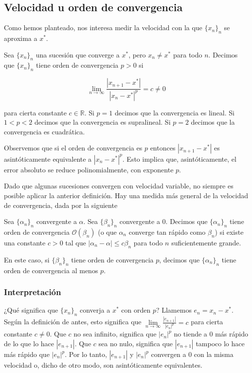 \subsection{Velocidad u orden de convergencia}

Como hemos planteado, nos interesa medir la velocidad con la que $\{x_n\}_n$ se aproxima a $x^*$.

\begin{defi}
Sea $\{x_n\}_n$ una sucesión que converge a $x^*$, pero $x_n \neq x^*$ para todo $n$. Decimos que $\{x_n\}_n$ tiene orden de convergencia $p > 0$ si

\[\lim\limits_{n \to \infty} \frac{|x_{n + 1} - x^*|}{|x_n - x^*|^p} = c \neq 0\]

para cierta constante $c \in \mathbb{R}$. Si $p = 1$ decimos que la convergencia es lineal.
Si $1 < p < 2$ decimos que la convergencia es supralineal.
Si $p = 2$ decimos que la convergencia es cuadrática.
\end{defi}

Observemos que si el orden de convergencia es $p$ entonces $|x_{n + 1} - x^*|$ es asintóticamente equivalente a $|x_n - x^*|^p$. Esto implica que, asintóticamente, el error absoluto se reduce polinomialmente, con exponente $p$.

Dado que algunas sucesiones convergen con velocidad variable, no siempre es posible aplicar la anterior definición. Hay una medida más general de la velocidad de convergencia, dada por la siguiente

\begin{defi}
Sea $\{\alpha_n\}_n$ convergente a $\alpha$. Sea $\{\beta_n\}_n$ convergente a 0. Decimos que $\{\alpha_n\}_n$ tiene orden de convergencia $\mathcal{O}(\beta_n)$ (o que $\alpha_n$ converge tan rápido como $\beta_n$) si existe una constante $c > 0$ tal que $\left|\alpha_n - \alpha \right| \leq c \beta_n$ para todo $n$ suficientemente grande. 

En este caso, si $\{\beta_n\}_n$ tiene orden de convergencia $p$, decimos que $\{\alpha_n\}_n$ tiene orden de convergencia al menos $p$. 
\end{defi}

\subsubsection{Interpretación}

¿Qué significa que $\{x_n\}_n$ converja a $x^*$ con orden $p$? Llamemos $e_n = x_n - x^*$. Según la definición de antes, esto significa que $\lim\limits_{n \to \infty}{\frac{|e_{n + 1}|}{|e_n|^p}} = c$ para cierta constante $c \neq 0$. Que $c$ no sea infinito, significa que $|e_{n}|^p$ no tiende a 0 más rápido de lo que lo hace $|e_{n + 1}|$. Que $c$ sea no nulo, significa que $|e_{n + 1}|$ tampoco lo hace más rápido que $|e_{n}|^p$. Por lo tanto, $|e_{n + 1}|$ y $|e_{n}|^p$ convergen a 0 con la misma velocidad o, dicho de otro modo, son asintóticamente equivalentes.

